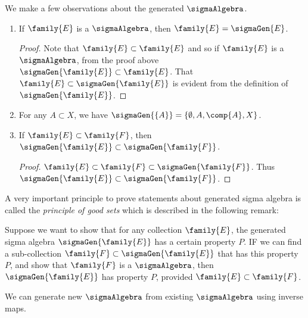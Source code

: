 \begin{Remark}\label{rmk:obs_sigma_gen}
    We make a few observations about the generated $\sigmaAlgebra$.
    \begin{enumerate}
	\item
	    If $\family{E}$ is a $\sigmaAlgebra$, then $\family{E} = \sigmaGen{E}$.
	    \begin{proof}
		Note that $\family{E} \subset \family{E}$ and so if $\family{E}$ is a
		$\sigmaAlgebra$, from the proof above $\sigmaGen{\family{E}} \subset \family{E}$.
		That $\family{E} \subset \sigmaGen{\family{E}}$ is evident from the definition of
		$\sigmaGen{\family{E}}$.
	    \end{proof}
	\item
	    For any $A \subset X$, we have $\sigmaGen{\lbrace A \rbrace} = \lbrace \emptyset, A,
	    \comp{A},X\rbrace$.
	\item If $\family{E} \subset \family{F}$, then $\sigmaGen{\family{E}} \subset
	    \sigmaGen{\family{F}}$.
	    \begin{proof}
		$\family{E} \subset \family{F} \subset \sigmaGen{\family{F}}$. Thus
		$\sigmaGen{\family{E}} \subset \sigmaGen{\family{F}}$.
	    \end{proof}
    \end{enumerate}
\end{Remark}
A very important principle to prove statements about generated sigma algebra is called the
\emph{principle of good sets} which is described in the following remark:
\begin{Remark}[name=Principle of good sets]\label{rmk:prin_good_sets}
    Suppose we want to show that for any collection $\family{E}$, the generated sigma algebra
    $\sigmaGen{\family{E}}$ has a certain property $P$. IF we can find a sub-collection $\family{F}
    \subset \sigmaGen{\family{E}}$ that has this property $P$, and show that $\family{F}$ is a
    $\sigmaAlgebra$, then $\sigmaGen{\family{E}}$ has property $P$, provided
    $\family{E}\subset\family{F}$.
\end{Remark}
We can generate new $\sigmaAlgebra$ from existing $\sigmaAlgebra$ using inverse maps.
